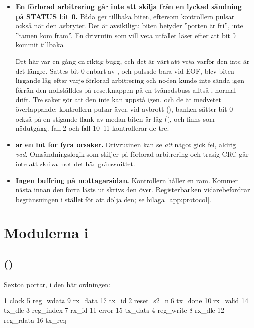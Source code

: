 \begin{itemize}
  \item \textbf{En förlorad arbitrering går inte att skilja från en lyckad sändning på STATUS
    bit 0.} Båda ger tillbaka biten, eftersom kontrollern pulsar  också när den
    avbryter. Det är avsiktligt: biten betyder ”porten är fri”, inte ”ramen kom fram”. En drivrutin
    som vill veta utfallet läser  efter att bit 0 kommit tillbaka.

    Det här var en gång en riktig bugg, och det är värt att veta varför den inte är det längre.
    Sattes bit 0 enbart av , och pulsade  bara vid EOF, blev biten
    liggande låg efter varje förlorad arbitrering och noden kunde inte sända igen förrän den
    nollställdes på resetknappen \textemdash{} på en tvånodsbuss alltså i normal drift. Tre saker gör
    att den inte kan uppstå igen, och de är medvetet överlappande: kontrollern pulsar 
    även vid avbrott (), banken sätter bit 0 också på en stigande flank av
     medan biten är låg (), och  finns som nödutgång.
     fall 2 och  fall 10--11 kontrollerar de tre.
  \item \textbf{ är en bit för fyra orsaker.} Drivrutinen kan se \emph{att} något gick
    fel, aldrig \emph{vad}. Omsändningslogik som skiljer på förlorad arbitrering och trasig CRC går
    inte att skriva mot det här gränssnittet.
  \item \textbf{Ingen buffring på mottagarsidan.} Kontrollern håller en ram. Kommer nästa innan den
    förra lästs ut skrivs den över. Registerbanken vidarebefordrar begränsningen i stället för att
    dölja den; se bilaga~\ref{app:protocol}.
\end{itemize}

\section{Modulerna i }
\label{app:project:bridge}

\subsection*{ ()}
Sexton portar, i den här ordningen:

\begin{textdrawing}
 1 clock        5 reg_wdata    9 rx_data     13 tx_id
 2 reset_s2_n   6 tx_done     10 rx_valid    14 tx_dlc
 3 reg_index    7 rx_id       11 error       15 tx_data
 4 reg_write    8 rx_dlc      12 reg_rdata   16 tx_req
\end{textdrawing}

